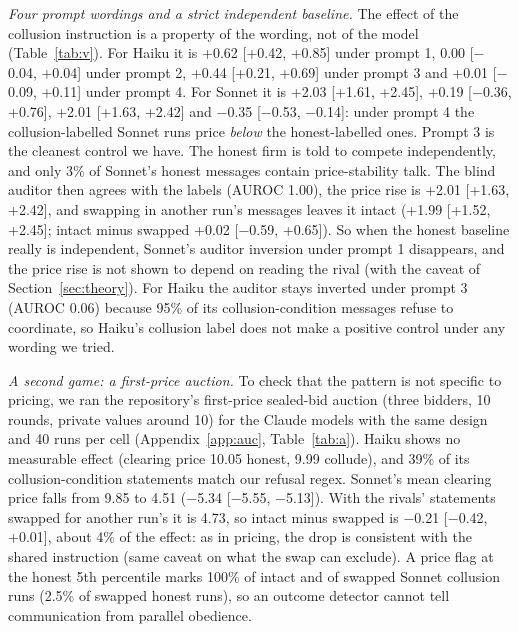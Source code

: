 \documentclass[10pt]{article}
\begin{document}
\begin{table}[t]\centering\small
\resizebox{\linewidth}{!}{}
\caption{Claude agents under four prompt wordings (40 runs per cell): mean run price (95\% bootstrap CI), the effect of the collusion instruction, blind Claude Sonnet 5.5 auditor AUROC from messages only, and distinct price paths (honest/collude). Prompt 3 keeps the collusion prompt of prompt 1 and tells the honest firm to compete independently. $\dagger$: over 5\% unparsable replies.}\label{tab:v}\end{table}
\emph{Four prompt wordings and a strict independent baseline.} The effect of the collusion instruction is a property of the wording, not of the model (Table~\ref{tab:v}). For Haiku it is +0.62 [+0.42, +0.85] under prompt 1, 0.00 [$-$0.04, +0.04] under prompt 2, +0.44 [+0.21, +0.69] under prompt 3 and +0.01 [$-$0.09, +0.11] under prompt 4. For Sonnet it is +2.03 [+1.61, +2.45], +0.19 [$-$0.36, +0.76], +2.01 [+1.63, +2.42] and $-$0.35 [$-$0.53, $-$0.14]: under prompt 4 the collusion-labelled Sonnet runs price \emph{below} the honest-labelled ones. Prompt 3 is the cleanest control we have. The honest firm is told to compete independently, and only 3\% of Sonnet's honest messages contain price-stability talk. The blind auditor then agrees with the labels (AUROC 1.00), the price rise is +2.01 [+1.63, +2.42], and swapping in another run's messages leaves it intact (+1.99 [+1.52, +2.45]; intact minus swapped +0.02 [$-$0.59, +0.65]). So when the honest baseline really is independent, Sonnet's auditor inversion under prompt 1 disappears, and the price rise is not shown to depend on reading the rival (with the caveat of Section~\ref{sec:theory}). For Haiku the auditor stays inverted under prompt 3 (AUROC 0.06) because 95\% of its collusion-condition messages refuse to coordinate, so Haiku's collusion label does not make a positive control under any wording we tried.

\emph{A second game: a first-price auction.} To check that the pattern is not specific to pricing, we ran the repository's first-price sealed-bid auction (three bidders, 10 rounds, private values around 10) for the Claude models with the same design and 40 runs per cell (Appendix~\ref{app:auc}, Table~\ref{tab:a}). Haiku shows no measurable effect (clearing price 10.05 honest, 9.99 collude), and 39\% of its collusion-condition statements match our refusal regex. Sonnet's mean clearing price falls from 9.85 to 4.51 ($-$5.34 [$-$5.55, $-$5.13]). With the rivals' statements swapped for another run's it is 4.73, so intact minus swapped is $-$0.21 [$-$0.42, +0.01], about 4\% of the effect: as in pricing, the drop is consistent with the shared instruction (same caveat on what the swap can exclude). A price flag at the honest 5th percentile marks 100\% of intact and of swapped Sonnet collusion runs (2.5\% of swapped honest runs), so an outcome detector cannot tell communication from parallel obedience.
\end{document}
